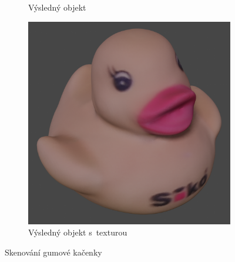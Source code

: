 \documentclass[12pt]{report}			%
\begin{document}
\begin{figure}[h]
\begin{subfigure}[b]{0.3\textwidth}
                        \caption{Výsledný objekt}
                    \end{subfigure}
                    \hfill
                    \begin{subfigure}[b]{0.3\textwidth}
                        \centering
                        \includegraphics[width=\textwidth]{images/kachnaObrazBavny.png}
                        \caption{Výsledný objekt s~texturou}
                    \end{subfigure}
                    \caption{Skenování gumové kačenky}
                \end{figure}
\end{document}
